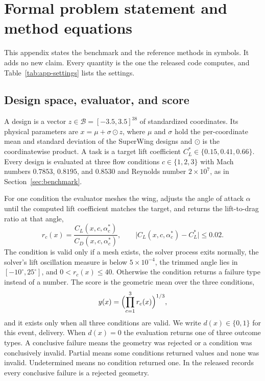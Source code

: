 \section{Formal problem statement and method equations}
\label{app:formal}

This appendix states the benchmark and the reference methods in symbols. It
adds no new claim. Every quantity is the one the released code computes, and
Table~\ref{tab:app-settings} lists the settings.

\subsection{Design space, evaluator, and score}

A design is a vector $z \in \mathcal{B} = [-3.5, 3.5]^{38}$ of standardized
coordinates. Its physical parameters are $x = \mu + \sigma \odot z$, where
$\mu$ and $\sigma$ hold the per-coordinate mean and standard deviation of the
SuperWing designs and $\odot$ is the coordinatewise product. A task is a target
lift coefficient $C_L^{*} \in \{0.15, 0.41, 0.66\}$. Every design is evaluated
at three flow conditions $c \in \{1, 2, 3\}$ with Mach numbers $0.7853$,
$0.8195$, and $0.8530$ and Reynolds number $2 \times 10^{7}$, as in
Section~\ref{sec:benchmark}.

For one condition the evaluator meshes the wing, adjusts the angle of attack
$\alpha$ until the computed lift coefficient matches the target, and returns
the lift-to-drag ratio at that angle,
\begin{equation}
r_c(x) = \frac{C_L(x, c, \alpha_c^{*})}{C_D(x, c, \alpha_c^{*})},
\qquad
\bigl|C_L(x, c, \alpha_c^{*}) - C_L^{*}\bigr| \le 0.02 .
\label{eq:condition}
\end{equation}
The condition is valid only if a mesh exists, the solver process exits
normally, the solver's lift oscillation measure is below $5 \times 10^{-4}$, the
trimmed angle lies in $[-10^{\circ}, 25^{\circ}]$, and $0 < r_c(x) \le 40$.
Otherwise the condition returns a failure type instead of a number. The score
is the geometric mean over the three conditions,
\begin{equation}
y(x) = \Bigl( \prod_{c=1}^{3} r_c(x) \Bigr)^{1/3},
\label{eq:score}
\end{equation}
and it exists only when all three conditions are valid. We write
$d(x) \in \{0, 1\}$ for this event, delivery. When $d(x) = 0$ the
evaluation returns one of three outcome types. A conclusive failure means the
geometry was rejected or a condition was conclusively invalid. Partial means
some conditions returned values and none was invalid. Undetermined means no
condition returned one. In the released records every conclusive failure is a
rejected geometry.

